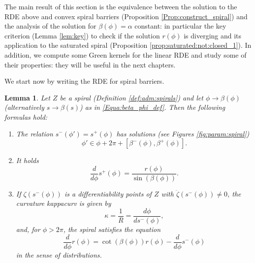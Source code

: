 \documentclass[reqno]{amsart}
\theoremstyle{definition} \newtheorem{definition}{Definition}[section]
\theoremstyle{definition} \newtheorem{remark}[definition]{Remark}
\theoremstyle{plain} \newtheorem{lemma}[definition]{Lemma}
\theoremstyle{plain} \newtheorem{proposition}[definition]{Proposition}
\theoremstyle{plain} \newtheorem{theorem}[definition]{Theorem}
\theoremstyle{plain} \newtheorem{corollary}[definition]{Corollary}
\theoremstyle{definition} \newtheorem{example}[definition]{Example}
\theoremstyle{plain} \newtheorem{claim}[clai]{Claim}
\theoremstyle{definition} \newtheorem{assumption}[definition]{Assumption}
\theoremstyle{definition} \newtheorem{observation}[definition]{Observation}
\newcommand{\1}{\mathbbm 1}
\numberwithin{equation}{section} %
\theoremstyle{plain} \newtheorem*{theorem*}{Theorem}
\theoremstyle{plain} \newtheorem{mthm}[maintheorem]{Main Theorem}
\theoremstyle{plain} \newtheorem*{mthm*}{Main Theorem}
\theoremstyle{plain} \newtheorem*{conjecture*}{Conjecture}
\theoremstyle{plain} \newtheorem{conjecture}[definition]{Conjecture}
\theoremstyle{plain} \newtheorem*{problem*}{Problem}
\begin{document}
The main result of this section is the equivalence between the solution to the RDE above and convex spiral barriers (Proposition \ref{Prop:construct_spiral}) and the analysis of the solution for $\beta(\phi) = \alpha$ constant: in particular the key criterion (Lemma \ref{lem:key}) to check if the solution $r(\phi)$ is diverging and its application to the saturated spiral (Proposition \ref{prop:saturated:not:closed_1}). In addition, we compute some Green kernels for the linear RDE and study some of their properties: they will be useful in the next chapters.

We start now by writing the RDE for spiral barriers.

\begin{lemma}
\label{lem:ODE:spiral}
Let $Z$ be a spiral (Definition \ref{def:adm:spirals}) and let $\phi \rightarrow \beta(\phi)$ (alternatively $s \rightarrow \beta(s)$) as in \eqref{Equa:beta_phi_def}. Then the following formulas hold:
\begin{enumerate}
\item The relation $s^-(\phi') = s^+(\phi)$ has solutions (see Figures \ref{fig:param:spiral}) %
\begin{equation}
\label{eq:subs:angle}
\phi' \in \phi + 2\pi + [\beta^-(\phi),\beta^+(\phi)].
\end{equation}
\item \label{Point_2:lem:ODE:spiral} It holds
\begin{equation}
\label{eq:var:length:1}
\frac{d}{d\phi} s^+(\phi) = \frac{r(\phi)}{\sin(\beta(\phi))}.
\end{equation}
\item \label{Point_3:lem:ODE:spiral} If $\zeta(s^-(\phi))$ is a differentiability points of $Z$ with $\ddot\zeta(s^-(\phi)) \not= 0$, the curvature  \gls{kappacurv} is given by 
\begin{equation*}
\kappa = \frac{1}{R} = \frac{d\phi}{ds^-(\phi)},
\end{equation*}
and, for $\phi > 2\pi$, the spiral satisfies the equation
\begin{equation}
\label{eq:spiral:angle}
\frac{d}{d\phi} r(\phi) = \cot(\beta(\phi)) r(\phi) - \frac{d}{d\phi} s^-(\phi)
\end{equation}
in the sense of distributions.
\end{enumerate}
\end{lemma}
\end{document}
